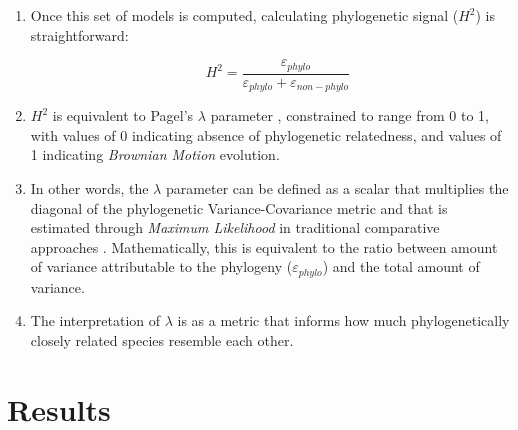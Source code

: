 \documentclass{article}\usepackage[]{graphicx}\usepackage[]{color}
\begin{document}
\begin{enumerate}
\item Once this set of models is computed, calculating phylogenetic signal ($H^{2}$) is straightforward:

\begin{equation}
\label{eq:8} 
\quad   H^{2} = \frac{\varepsilon_{phylo}}{\varepsilon_{phylo} + \varepsilon_{non-phylo}}
\end{equation}

\item $H^{2}$ is equivalent to Pagel's \cite{pagel1999inferring} $\lambda$ parameter \citep{housworth2004phylogenetic}, constrained to range from 0 to 1, with values of 0 indicating absence of phylogenetic relatedness, and values of 1 indicating \emph{Brownian Motion} evolution. 

\item In other words, the $\lambda$ parameter can be defined as a scalar that multiplies the diagonal of the phylogenetic Variance-Covariance metric and that is estimated through \emph{Maximum Likelihood} in traditional comparative approaches \citep{freckleton2002phylogenetic}. Mathematically, this is equivalent to the ratio between amount of variance attributable to the phylogeny ($\varepsilon_{phylo}$) and the total amount of variance.

\item The interpretation of $\lambda$ is as a metric that informs how much phylogenetically closely related species resemble each other.


\end{enumerate}




\section*{Results}
\end{document}
